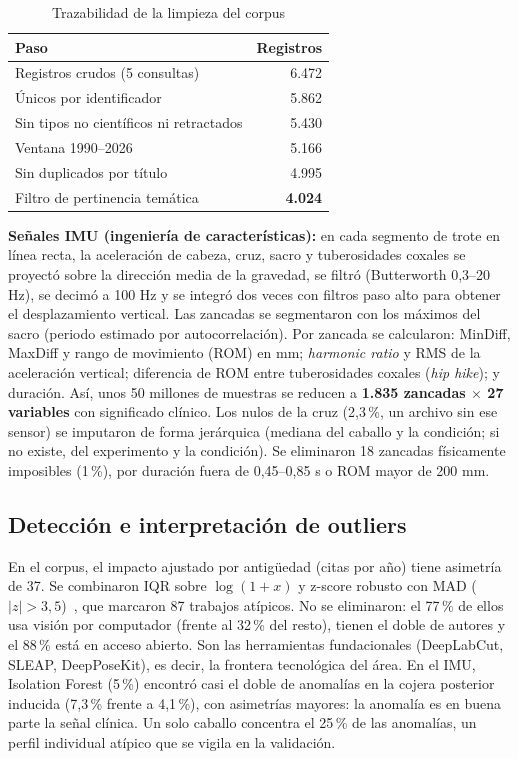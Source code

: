 \documentclass[conference,a4paper]{IEEEtran}
\begin{document}
\begin{table}[t]
\centering
\caption{Trazabilidad de la limpieza del corpus}
\label{tab:limpieza}
\begin{tabular}{lr}
\toprule
Paso & Registros \\
\midrule
Registros crudos (5 consultas) & 6.472 \\
Únicos por identificador & 5.862 \\
Sin tipos no científicos ni retractados & 5.430 \\
Ventana 1990--2026 & 5.166 \\
Sin duplicados por título & 4.995 \\
Filtro de pertinencia temática & \textbf{4.024} \\
\bottomrule
\end{tabular}
\end{table}

\textbf{Señales IMU (ingeniería de características):} en cada segmento de trote en línea recta, la aceleración de cabeza, cruz, sacro y tuberosidades coxales se proyectó sobre la dirección media de la gravedad, se filtró (Butterworth 0,3--20 Hz), se decimó a 100 Hz y se integró dos veces con filtros paso alto para obtener el desplazamiento vertical. Las zancadas se segmentaron con los máximos del sacro (periodo estimado por autocorrelación). Por zancada se calcularon: MinDiff, MaxDiff y rango de movimiento (ROM) en mm; \emph{harmonic ratio} y RMS de la aceleración vertical; diferencia de ROM entre tuberosidades coxales (\emph{hip hike}); y duración. Así, unos 50 millones de muestras se reducen a \textbf{1.835 zancadas $\times$ 27 variables} con significado clínico. Los nulos de la cruz (2,3\,\%, un archivo sin ese sensor) se imputaron de forma jerárquica (mediana del caballo y la condición; si no existe, del experimento y la condición). Se eliminaron 18 zancadas físicamente imposibles (1\,\%), por duración fuera de 0,45--0,85 s o ROM mayor de 200 mm.

\subsection{Detección e interpretación de outliers}
En el corpus, el impacto ajustado por antigüedad (citas por año) tiene asimetría de 37. Se combinaron IQR sobre $\log(1+x)$ y z-score robusto con MAD ($|z|>3{,}5$)~\cite{iglewicz1993}, que marcaron 87 trabajos atípicos. No se eliminaron: el 77\,\% de ellos usa visión por computador (frente al 32\,\% del resto), tienen el doble de autores y el 88\,\% está en acceso abierto. Son las herramientas fundacionales (DeepLabCut, SLEAP, DeepPoseKit), es decir, la frontera tecnológica del área. En el IMU, Isolation Forest (5\,\%) encontró casi el doble de anomalías en la cojera posterior inducida (7,3\,\% frente a 4,1\,\%), con asimetrías mayores: la anomalía es en buena parte la señal clínica. Un solo caballo concentra el 25\,\% de las anomalías, un perfil individual atípico que se vigila en la validación.
\end{document}
